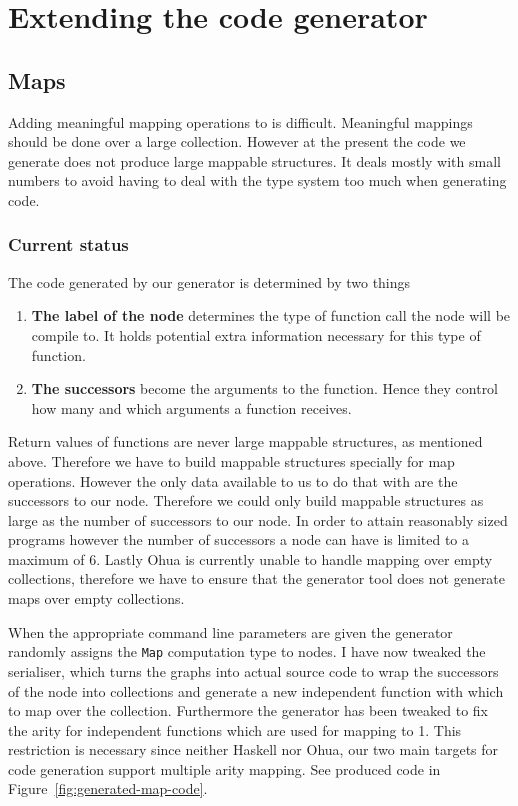 \chapter{Extending the code generator}

\label{ch:extending-code-generator}

\section{Maps}

Adding meaningful mapping operations to is difficult.
Meaningful mappings should be done over a large collection.
However at the present the code we generate does not produce large mappable structures.
It deals mostly with small numbers to avoid having to deal with the type system too much when generating code.

\subsection{Current status}

The code generated by our generator is determined by two things

\begin{enumerate}
    \item \textbf{The label of the node} determines the type of function call the node will be compile to.
          It holds potential extra information necessary for this type of function.
    \item \textbf{The successors} become the arguments to the function. Hence they control how many and which arguments a function receives.
\end{enumerate}

Return values of functions are never large mappable structures, as mentioned above.
Therefore we have to build mappable structures specially for map operations.
However the only data available to us to do that with are the successors to our node.
Therefore we could only build mappable structures as large as the number of successors to our node.
In order to attain reasonably sized programs however the number of successors a node can have is limited to a maximum of 6.
Lastly Ohua is currently unable to handle mapping over empty collections, therefore we have to ensure that the generator tool does not generate maps over empty collections.

When the appropriate command line parameters are given the generator randomly assigns the \texttt{Map} computation type to nodes.
I have now tweaked the serialiser, which turns the graphs into actual source code to wrap the successors of the node into collections and generate a new independent function with which to map over the collection.
Furthermore the generator has been tweaked to fix the arity for independent functions which are used for mapping to 1.
This restriction is necessary since neither Haskell nor Ohua, our two main targets for code generation support multiple arity mapping.
See produced code in Figure~\ref{fig:generated-map-code}. 

